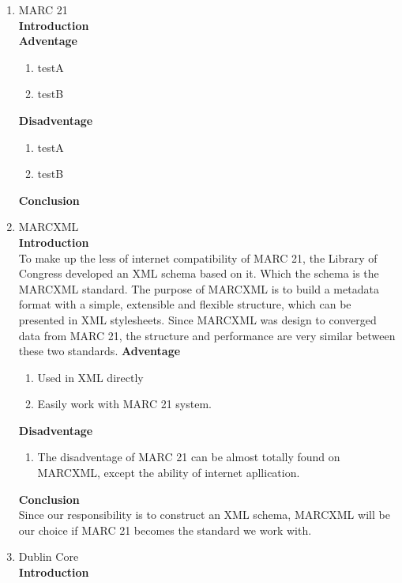 \begin{enumerate}
	\item MARC 21\\
	{\bf Introduction}\\
	
	{\bf Adventage}
	\begin{enumerate}
		\item testA
		\item testB	
	\end{enumerate}	
	{\bf Disadventage}
	\begin{enumerate}
		\item testA
		\item testB
	\end{enumerate}
	{\bf Conclusion}\\
	
	\item MARCXML\\
	{\bf Introduction}\\
	To make up the less of internet compatibility of MARC 21, the Library of Congress developed an XML schema based on it. Which the schema is the MARCXML standard. The purpose of MARCXML is to build a metadata format with a simple, extensible and flexible structure, which can be presented in XML stylesheets. Since MARCXML was design to converged data from MARC 21, the structure and performance are very similar between these two standards.  
	{\bf Adventage}
	\begin{enumerate}
		\item Used in XML directly
		\item Easily work with MARC 21 system.
	\end{enumerate}	
	{\bf Disadventage}
	\begin{enumerate}
		\item The disadventage of MARC 21 can be almost totally found on MARCXML, except the ability of internet apllication.
	\end{enumerate}
	{\bf Conclusion}\\
	Since our responsibility is to construct an XML schema, MARCXML will be our choice if MARC 21 becomes the standard we work with.
	\item Dublin Core\\
	{\bf Introduction}\\
	

\end{enumerate}
